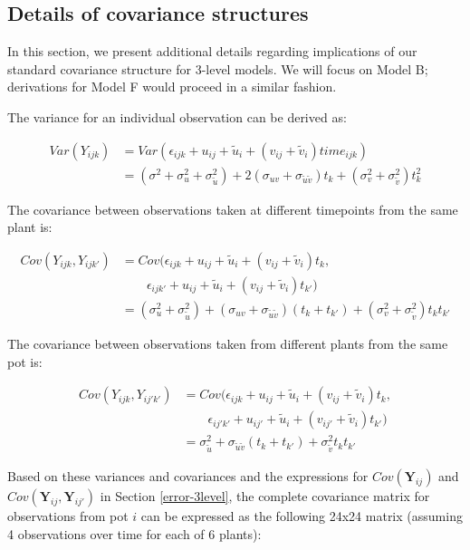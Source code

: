 \documentclass[
]{krantz}
\begin{document}
\hypertarget{optionalerror}{%
\subsection{Details of covariance structures}\label{optionalerror}}

In this section, we present additional details regarding implications of our standard covariance structure for 3-level models. We will focus on Model B; derivations for Model F would proceed in a similar fashion.

The variance for an individual observation can be derived as:

\begin{align*}
Var(Y_{ijk}) & = Var(\epsilon_{ijk}+u_{ij}+\tilde{u}_{i}+(v_{ij}+\tilde{v}_{i})\textstyle{time}_{ijk}) \\
 & = (\sigma^{2} + \sigma_{u}^{2} + \sigma_{\tilde{u}}^{2}) + 2(\sigma_{uv} + \sigma_{\tilde{u}\tilde{v}})t_k + (\sigma_{v}^{2} + \sigma_{\tilde{v}}^{2})t_{k}^{2}
\end{align*}

The covariance between observations taken at different timepoints from the same plant is:

\begin{align*}
Cov(Y_{ijk},Y_{ijk'}) & = Cov(\epsilon_{ijk}+u_{ij}+\tilde{u}_{i}+(v_{ij}+\tilde{v}_{i})t_{k}, \\
 & \qquad \epsilon_{ijk'}+u_{ij}+\tilde{u}_{i}+(v_{ij}+\tilde{v}_{i})t_{k'}) \\
 & = (\sigma_{u}^{2} + \sigma_{\tilde{u}}^{2}) + (\sigma_{uv} + \sigma_{\tilde{u}\tilde{v}})(t_{k}+t_{k'}) + (\sigma_{v}^{2} + \sigma_{\tilde{v}}^{2})t_{k}t_{k'}
\end{align*}

The covariance between observations taken from different plants from the same pot is:

\begin{align*}
Cov(Y_{ijk},Y_{ij'k'}) & = Cov(\epsilon_{ijk}+u_{ij}+\tilde{u}_{i}+(v_{ij}+\tilde{v}_{i})t_{k}, \\
 & \qquad \epsilon_{ij'k'}+u_{ij'}+\tilde{u}_{i}+(v_{ij'}+\tilde{v}_{i})t_{k'}) \\
 & = \sigma_{\tilde{u}}^{2} + \sigma_{\tilde{u}\tilde{v}}(t_{k}+t_{k'}) + \sigma_{\tilde{v}}^{2}t_{k}t_{k'}
\end{align*}

Based on these variances and covariances and the expressions for \(Cov(\textbf{Y}_{ij})\) and \(Cov(\textbf{Y}_{ij},\textbf{Y}_{ij'})\) in Section \ref{error-3level}, the complete covariance matrix for observations from pot \(i\) can be expressed as the following 24x24 matrix (assuming 4 observations over time for each of 6 plants):
\end{document}
